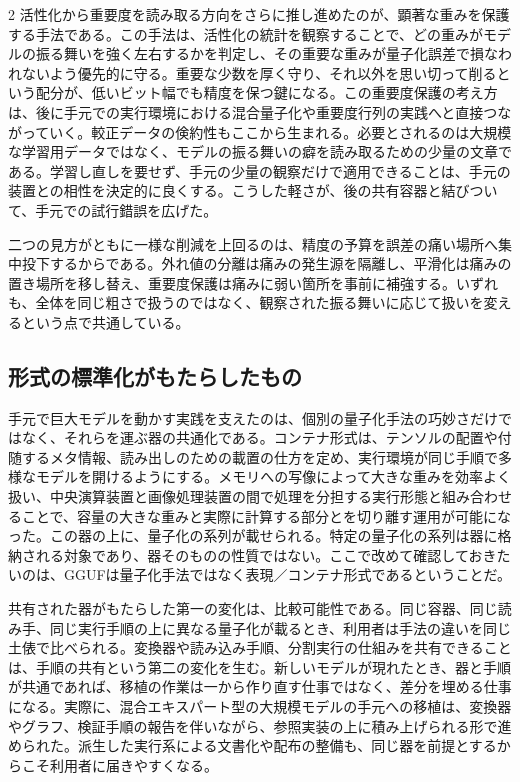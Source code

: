 \documentclass[lualatex,a4paper,10pt]{jlreq}
\begin{document}
\begin{multicols}{2}
活性化から重要度を読み取る方向をさらに推し進めたのが、顕著な重みを保護する手法である\autocite{awq}。この手法は、活性化の統計を観察することで、どの重みがモデルの振る舞いを強く左右するかを判定し、その重要な重みが量子化誤差で損なわれないよう優先的に守る。重要な少数を厚く守り、それ以外を思い切って削るという配分が、低いビット幅でも精度を保つ鍵になる。この重要度保護の考え方は、後に手元での実行環境における混合量子化や重要度行列の実践へと直接つながっていく。較正データの倹約性もここから生まれる。必要とされるのは大規模な学習用データではなく、モデルの振る舞いの癖を読み取るための少量の文章である。学習し直しを要せず、手元の少量の観察だけで適用できることは、手元の装置との相性を決定的に良くする。こうした軽さが、後の共有容器と結びついて、手元での試行錯誤を広げた。

二つの見方がともに一様な削減を上回るのは、精度の予算を誤差の痛い場所へ集中投下するからである。外れ値の分離は痛みの発生源を隔離し、平滑化は痛みの置き場所を移し替え、重要度保護は痛みに弱い箇所を事前に補強する。いずれも、全体を同じ粗さで扱うのではなく、観察された振る舞いに応じて扱いを変えるという点で共通している。

\subsection{形式の標準化がもたらしたもの}
手元で巨大モデルを動かす実践を支えたのは、個別の量子化手法の巧妙さだけではなく、それらを運ぶ器の共通化である。コンテナ形式は、テンソルの配置や付随するメタ情報、読み出しのための載置の仕方を定め、実行環境が同じ手順で多様なモデルを開けるようにする\autocite{gguf}。メモリへの写像によって大きな重みを効率よく扱い、中央演算装置と画像処理装置の間で処理を分担する実行形態と組み合わせることで、容量の大きな重みと実際に計算する部分とを切り離す運用が可能になった\autocite{llamacpp}。この器の上に、量子化の系列が載せられる。特定の量子化の系列は器に格納される対象であり、器そのものの性質ではない。ここで改めて確認しておきたいのは、GGUFは量子化手法ではなく表現／コンテナ形式であるということだ。

共有された器がもたらした第一の変化は、比較可能性である。同じ容器、同じ読み手、同じ実行手順の上に異なる量子化が載るとき、利用者は手法の違いを同じ土俵で比べられる。変換器や読み込み手順、分割実行の仕組みを共有できることは、手順の共有という第二の変化を生む。新しいモデルが現れたとき、器と手順が共通であれば、移植の作業は一から作り直す仕事ではなく、差分を埋める仕事になる。実際に、混合エキスパート型の大規模モデルの手元への移植は、変換器やグラフ、検証手順の報告を伴いながら、参照実装の上に積み上げられる形で進められた\autocite{llamacpp}\autocite{qwenpr}。派生した実行系による文書化や配布の整備も、同じ器を前提とするからこそ利用者に届きやすくなる\autocite{unslothglm}。


\end{multicols}
\end{document}

